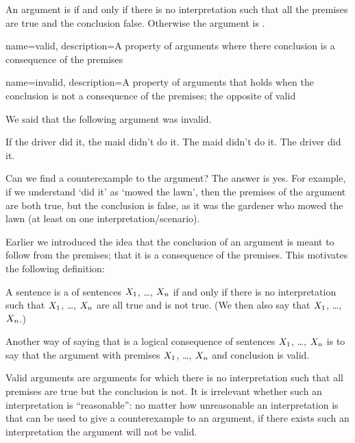 \begin{definition}
		An argument is  if and only if there is no interpretation such that all the premises are true and the conclusion false. Otherwise the argument is .
	\end{definition}	

{
name=valid,
description={A property of arguments where there conclusion is a consequence of the premises}
}

{
name=invalid,
description={A property of arguments that holds when the conclusion is not a consequence of the premises; the opposite of \gls{valid}}
}

We said that the following argument was invalid.	
\begin{earg}\label{argMaidDriver}
	\prem If the driver did it, the maid didn't do it.
	\prem The maid didn't do it.
	\conc The driver did it.
\end{earg}	
Can we find a counterexample to the argument? The answer is yes. For example, if we understand `did it' as `mowed the lawn', then the premises of the argument are both true, but the conclusion is false, as it was the gardener who mowed the lawn (at least on one interpretation/scenario).

Earlier we introduced the idea that the conclusion of an argument is meant to follow from the premises; that it is a consequence of the premises. This motivates the following definition:

\begin{definition}
		A sentence \metaY is a  of sentences $X_1$, \dots, $X_n$ if and only if there is no interpretation such that $X_1$, \dots, $X_n$ are all true and \metaY is not true. (We then also say that \metaY {} $X_1$, \dots, $X_n$.)
	\end{definition}%

Another way of saying that  \metaY is a logical consequence of sentences $X_1$, \dots, $X_n$ is to say that the argument with premises $X_1$, \dots, $X_n$ and conclusion \metaY is valid.

Valid arguments are arguments for which there is no interpretation such that all premises are true but the conclusion is not. It is irrelevant whether such an interpretation is ``reasonable'': no matter how unreasonable an interpretation is that can be used to give a counterexample to an argument, if there exists such an interpretation the argument will not be valid.

